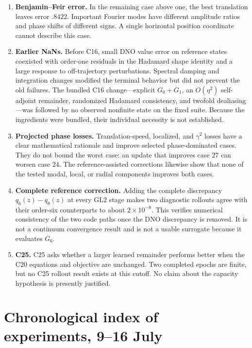 \documentclass[11pt]{article}
\begin{document}
{\begin{enumerate}[leftmargin=*,label=\textbf{\arabic*.}]
  \item \textbf{Benjamin--Feir error.}  In the remaining case above one, the
  best translation leaves error $.8422$.  Important Fourier modes have
  different amplitude ratios and phase shifts of different signs.  A single
  horizontal position coordinate cannot describe this case.

  \item \textbf{Earlier NaNs.}  Before C16, small DNO value error on reference
  states coexisted with order-one residuals in the Hadamard shape identity and
  a large response to off-trajectory perturbations.  Spectral damping and
  integration changes modified the terminal behavior but did not prevent the
  old failures.  The bundled C16 change---explicit $G_0+G_1$, an
  $O(\eta^2)$ self-adjoint remainder, randomized Hadamard consistency, and
  twofold dealiasing---was followed by no observed nonfinite state on the fixed
  suite.  Because the ingredients were bundled, their individual necessity is
  not established.

  \item \textbf{Projected phase losses.}  Translation-speed, localized, and
  $\gamma^2$ losses have a clear mathematical rationale and improve selected
  phase-dominated cases.  They do not bound the worst case: an update that
  improves case 27 can worsen case 24.  The reference-assisted corrections
  likewise show that none of the tested modal, local, or radial components
  improves both cases.

  \item \textbf{Complete reference correction.}  Adding the complete
  discrepancy $q_6(z)-q_\theta(z)$ at every GL2 stage makes two diagnostic
  rollouts agree with their order-six counterparts to about $2\times10^{-8}$.
  This verifies numerical consistency of the two code paths once the DNO
  discrepancy is removed.  It is not a continuum convergence result and is
  not a usable surrogate because it evaluates $G_6$.

  \item \textbf{C25.}  C25 asks whether a larger learned remainder performs
  better when the C20 equations and objective are unchanged.  Two completed
  epochs are finite, but no C25 rollout result exists at this cutoff.  No claim
  about the capacity hypothesis is presently justified.
\end{enumerate}

\appendix

\section{Chronological index of experiments, 9--16 July}

}
\end{document}

